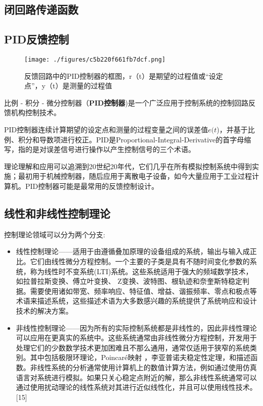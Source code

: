 \subsection{闭回路传递函数}



\subsection{PID反馈控制}

\begin{figure}[ht]
\centering
\texttt{[image: ./figures/c5b220f661fb7dcf.png]}
\caption{反馈回路中的PID控制器的框图，r（t）是期望的过程值或“设定点”，y（t）是测量的过程值} \label{fig_KZLL_1}
\end{figure}

比例 - 积分 - 微分控制器（\textbf{PID控制器})是一个广泛应用于控制系统的控制回路反馈机构控制技术。

PID控制器连续计算期望的设定点和测量的过程变量之间的误差值$e(t$)，并基于比例、积分和导数项进行校正。PID是Proportional-Integral-Derivative的首字母缩写，指的是对误差信号进行操作以产生控制信号的三个术语。

理论理解和应用可以追溯到20世纪20年代，它们几乎在所有模拟控制系统中得到实施；最初用于机械控制器，随后应用于离散电子设备，如今大量应用于工业过程计算机。PID控制器可能是最常用的反馈控制设计。

\subsection{线性和非线性控制理论}

控制理论领域可以分为两个分支:

\begin{itemize}
\item 线性控制理论——适用于由遵循叠加原理的设备组成的系统，输出与输入成正比。它们由线性微分方程控制。一个主要的子类是具有不随时间变化参数的系统，称为线性时不变系统(LTI)系统。这些系统适用于强大的频域数学技术，如拉普拉斯变换、傅立叶变换、 Z变换、波特图、根轨迹和奈奎斯特稳定判据。需要使用诸如带宽、频率响应、特征值、增益、谐振频率、零点和极点等术语来描述系统，这些描述术语为大多数感兴趣的系统提供了系统响应和设计技术的解决方案。
\item 非线性控制理论——因为所有的实际控制系统都是非线性的，因此非线性理论可以应用在更真实的系统中。这些系统通常由非线性微分方程控制，开发用于处理它们的少数数学技术更加困难且不那么通用，通常仅适用于狭窄的系统类别。其中包括极限环理论，Poincaré映射 ，李亚普诺夫稳定性定理，和描述函数。非线性系统的分析通常使用计算机上的数值计算方法，例如通过使用仿真语言对系统进行模拟。如果只关心稳定点附近的解，那么非线性系统通常可以通过使用扰动理论的线性系统对其进行近似线性化，并且可以使用线性技术。[15]
\end{itemize}

